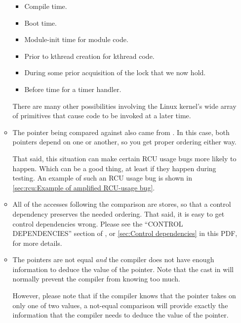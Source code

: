 \begin{itemize}
\begin{itemize}
                \begin{itemize}
		\item	Compile time.

		\item	Boot time.

		\item	Module-init time for module code.

		\item	Prior to kthread creation for kthread code.

		\item	During some prior acquisition of the lock that
			we now hold.

		\item	Before  time for a timer handler.
		\end{itemize}

		There are many other possibilities involving the Linux
		kernel's wide array of primitives that cause code to
		be invoked at a later time.

	\item	The pointer being compared against also came from
		.
		In this case, both pointers depend
		on one  or another, so you get proper
		ordering either way.

		That said, this situation can make certain RCU usage
		bugs more likely to happen.
		Which can be a good thing,
		at least if they happen during testing.
		An example
		of such an RCU usage bug is shown in
		\cref{sec:rcu:Example of amplified RCU-usage bug}.

	\item	All of the accesses following the comparison are stores,
		so that a control dependency preserves the needed ordering.
		That said, it is easy to get control dependencies wrong.
		Please see the ``CONTROL DEPENDENCIES'' section of
		,
		or \cref{sec:Control dependencies} in this PDF,
		for more details.

	\item	The pointers are not equal \emph{and} the compiler does
		not have enough information to deduce the value of the
		pointer.
		Note that the  cast in 
		will normally prevent the compiler from knowing too much.

		However, please note that if the compiler knows that the
		pointer takes on only one of two values, a not-equal
		comparison will provide exactly the information that the
		compiler needs to deduce the value of the pointer.
	\end{itemize}


\end{itemize}
